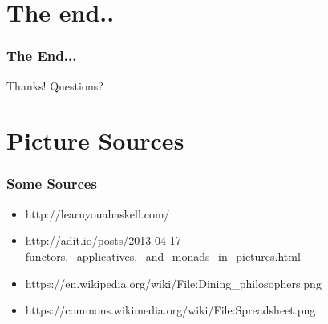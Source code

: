 \documentclass[12pt, xcolor=table]{beamer}
\begin{document}
\section{The end..} %
\begin{frame}
    \frametitle{The End...}
    \begin{block}{Thanks!}
        Questions?
    \end{block}
\end{frame}

\section{Picture Sources}
\begin{frame}
    \frametitle{Some Sources}
    \begin{itemize}
        \item \tiny{http://learnyouahaskell.com/}
        \item \tiny{http://adit.io/posts/2013-04-17-functors,\_applicatives,\_and\_monads\_in\_pictures.html}
        \item \tiny{https://en.wikipedia.org/wiki/File:Dining\_philosophers.png}
        \item \tiny{https://commons.wikimedia.org/wiki/File:Spreadsheet.png}
    \end{itemize}
\end{frame}
\end{document}
